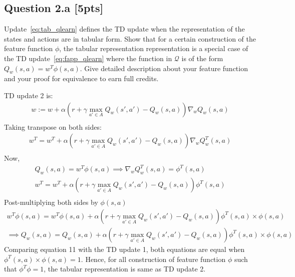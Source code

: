 \documentclass[12pt]{article}
\begin{document}
\noindent
\begin{solution}
\end{solution}


\subsection*{Question 2.a \textbf{[5pts]}}
Update~\ref{eq:tab_qlearn} defines the TD update when the representation of the states and actions are in tabular form. Show that for a certain construction of the feature function $\phi$, the tabular representation representation is a special case of the TD update~\ref{eq:fapp_qlearn} where the function in $\mathcal Q$ is of the form $Q _w(s, a) = w ^T \phi(s, a)$. Give detailed description about your feature function and your proof for equivalence to earn full credits. \\

\noindent
\begin{solution}
TD update 2 is:
\begin{align}
w := w + 
		\alpha \left( 
			r + \gamma \max _{a' \in A} Q _w(s', a') 
				- Q _w(s, a) 
		\right) \nabla _w 
			Q _w (s, a) \\
\end{align}
Taking transpose on both sides:
\begin{align}
w^T = w^T + 
		\alpha \left( 
			r + \gamma \max _{a' \in A} Q _w(s', a') 
				- Q _w(s, a) 
		\right) \nabla _w 
			Q_w^T (s, a) \\
\end{align}
Now,
\begin{align}
Q_w(s, a) = w ^T \phi(s, a) \implies \nabla _w Q_w^T (s, a) = \phi^T(s,a) \\
w^T = w^T + 
		\alpha \left( 
			r + \gamma \max _{a' \in A} Q _w(s', a') 
				- Q _w(s, a) 
		\right) \phi^T(s,a) \\
\end{align}
Post-multiplying both sides by $\phi(s,a)$
\begin{align}
w^T\phi(s,a) = w^T\phi(s,a) + 
		\alpha \left(r + \gamma \max _{a' \in A} Q _w(s', a') - Q_w(s, a) \right) \phi^T(s,a)\times \phi(s,a) \\
\implies Q_w(s, a) = Q_w(s, a) + 
		\alpha \left(r + \gamma \max _{a' \in A} Q _w(s', a') - Q_w(s, a) \right) \phi^T(s,a)\times \phi(s,a)
\end{align}
Comparing equation 11 with the TD update 1, both equations are equal when $ \phi^T(s,a)\times \phi(s,a) = 1$. Hence, for all construction of feature function $\phi$ such that $\phi^T \phi =1$, the tabular representation is same as TD update 2.
\end{solution}
\end{document}
